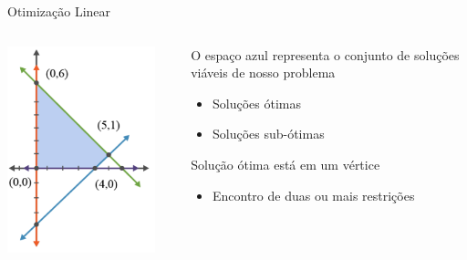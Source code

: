 \documentclass[compress]{beamer}
\begin{document}

\begin{frame}{Otimização Linear}

\begin{columns}[T]
    \begin{column}{.58\textwidth}
        \centering \includegraphics[width=0.9\textwidth]{images/modelo_pl.png}
    \end{column}
    \begin{column}{.4\textwidth}
        \vspace{1cm}
        O espaço azul representa o conjunto de soluções viáveis de nosso problema
        \begin{itemize}
            \item Soluções ótimas
            \item Soluções sub-ótimas
        \end{itemize}
        
        \vspace{1cm}
        
        Solução ótima está em um vértice
        \begin{itemize}
            \item Encontro de duas ou mais restrições
        \end{itemize}
    \end{column}
\end{columns}

\end{frame}
\end{document}
